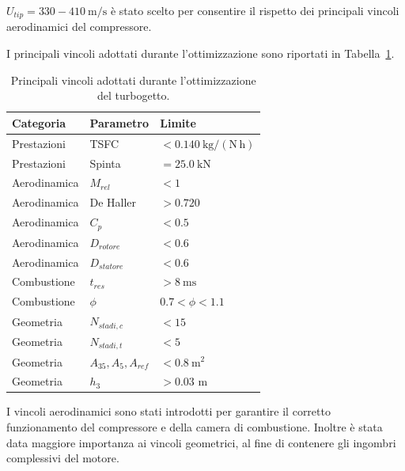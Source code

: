 $U_{tip}=330{-}410\ \mathrm{m/s}$ è stato scelto per
consentire il rispetto dei principali vincoli aerodinamici del compressore.

I principali vincoli adottati durante l'ottimizzazione sono riportati in
Tabella~\ref{tab:vincoli_turbojet}.

\begin{table}[H]
\centering
\caption{Principali vincoli adottati durante l'ottimizzazione del turbogetto.}
\fontsize{11pt}{11pt}\selectfont
\renewcommand{\arraystretch}{1}
\label{tab:vincoli_turbojet}
\begin{tabular}{lll}
\toprule
\textbf{Categoria} & \textbf{Parametro} & \textbf{Limite} \\
\midrule

Prestazioni
& TSFC
& $<0.140\ \mathrm{kg/(N\,h)}$ \\

Prestazioni
& Spinta
& $=25.0\ \mathrm{kN}$ \\

Aerodinamica
& $M_{rel}$
& $<1$ \\

Aerodinamica
& De Haller
& $>0.720$ \\

Aerodinamica
& $C_p$
& $<0.5$ \\

Aerodinamica
& $D_{rotore}$
& $<0.6$ \\

Aerodinamica
& $D_{statore}$
& $<0.6$ \\

Combustione
& $t_{res}$
& $>8\ \mathrm{ms}$ \\

Combustione
& $\phi$
& $0.7<\phi<1.1$ \\

Geometria
& $N_{stadi,c}$
& $<15$ \\

Geometria
& $N_{stadi,t}$
& $<5$ \\

Geometria
& $A_{35},A_{5},A_{ref}$
& $<0.8\ \mathrm{m^2}$ \\

Geometria
& $h_3$
& $> 0.03 $ m \\

\bottomrule
\end{tabular}
\end{table}

I vincoli aerodinamici sono stati introdotti per garantire il corretto funzionamento del compressore e della camera di combustione. Inoltre è stata data maggiore importanza ai vincoli geometrici, al fine di contenere gli ingombri complessivi del motore.

